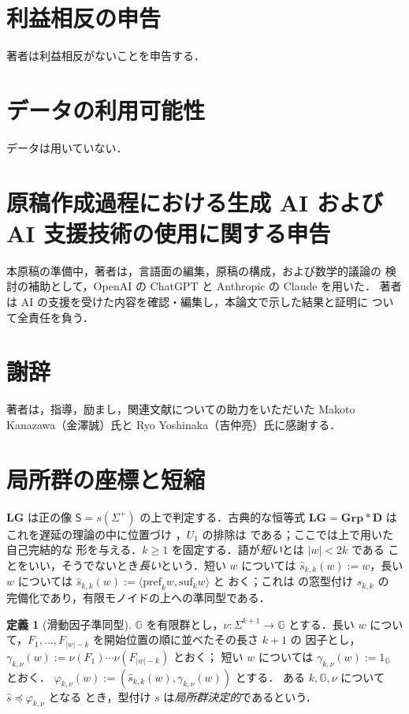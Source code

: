 \documentclass[11pt,a4paper]{ltjsarticle}
\numberwithin{equation}{section}
\theoremstyle{plain}
\theoremstyle{definition}
\newtheorem{definition}[theorem]{定義}
\theoremstyle{remark}
\theoremstyle{plain}
\newcommand{\LG}{\mathbf{LG}}
\begin{document}
\section*{利益相反の申告}
著者は利益相反がないことを申告する．

\section*{データの利用可能性}
データは用いていない．

\section*{原稿作成過程における生成 AI および AI 支援技術の使用に関する申告}
本原稿の準備中，著者は，言語面の編集，原稿の構成，および数学的議論の
検討の補助として，OpenAI の ChatGPT と Anthropic の Claude を用いた．
著者は AI の支援を受けた内容を確認・編集し，本論文で示した結果と証明に
ついて全責任を負う．

\section*{謝辞}
著者は，指導，励まし，関連文献についての助力をいただいた
Makoto Kanazawa（金澤誠）氏と Ryo Yoshinaka（吉仲亮）氏に感謝する．

\appendix

\section{局所群の座標と短縮}
\label{app:lg}

$\LG$ は正の像 $\mathsf S=s(\Sigma^+)$ の上で判定する．古典的な恒等式
$\LG=\mathbf{Grp}*\mathbf D$ はこれを遅延の理論の中に位置づけ
\cite{Straubing1985,Tilson1987}，$U_1$ の排除は
\cite[命題~2.3]{AlmeidaEtAl2009} である；ここでは上で用いた自己完結的な
形を与える．$k\ge1$ を固定する．語が\emph{短い}とは $|w|<2k$ である
ことをいい，そうでないとき\emph{長い}という．短い $w$ については
$\widehat s_{k,k}(w):=w$，長い $w$ については
$\widehat s_{k,k}(w):=\langle\mathrm{pref}_k w,\mathrm{suf}_k w\rangle$ と
おく；これは \cite[命題~3.3]{kuriyamaCFG} の窓型付け $s_{k,k}$ の
完備化であり，有限モノイドの上への準同型である．

\begin{definition}[滑動因子準同型]
\label{def:sliding}
$\mathbb G$ を有限群とし，$\nu:\Sigma^{k+1}\to\mathbb G$ とする．長い $w$
について，$F_1,\ldots,F_{|w|-k}$ を開始位置の順に並べたその長さ $k+1$ の
因子とし，$\gamma_{k,\nu}(w):=\nu(F_1)\cdots\nu(F_{|w|-k})$ とおく；
短い $w$ については $\gamma_{k,\nu}(w):=1_{\mathbb G}$ とおく．
$\varphi_{k,\nu}(w):=(\widehat s_{k,k}(w),\gamma_{k,\nu}(w))$ とする．
ある $k,\mathbb G,\nu$ について $\widehat s\preceq\varphi_{k,\nu}$ となる
とき，型付け $s$ は\emph{局所群決定的}であるという．
\end{definition}
\end{document}
